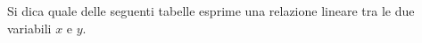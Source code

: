 Si dica quale delle seguenti tabelle esprime una relazione lineare 
tra le due variabili \(\displaystyle x\) e \(\displaystyle y\). 